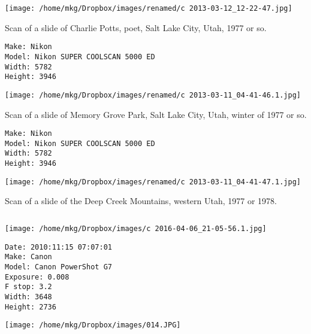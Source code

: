 \clearpage
\texttt{[image: /home/mkg/Dropbox/images/renamed/c 2013-03-12\_12-22-47.jpg]}

\clearpage

\noindent Scan of a slide of Charlie Potts, poet, Salt Lake City, Utah, 1977 or so.

\begin{lstlisting}
Make: Nikon
Model: Nikon SUPER COOLSCAN 5000 ED
Width: 5782
Height: 3946

\end{lstlisting}

\clearpage
\texttt{[image: /home/mkg/Dropbox/images/renamed/c 2013-03-11\_04-41-46.1.jpg]}

\clearpage

\noindent Scan of a slide of Memory Grove Park, Salt Lake City, Utah, winter of 1977 or so.

\begin{lstlisting}
Make: Nikon
Model: Nikon SUPER COOLSCAN 5000 ED
Width: 5782
Height: 3946

\end{lstlisting}

\clearpage
\texttt{[image: /home/mkg/Dropbox/images/renamed/c 2013-03-11\_04-41-47.1.jpg]}

\clearpage

\noindent Scan of a slide of the Deep Creek Mountains, western Utah, 1977 or 1978.

\begin{lstlisting}

\end{lstlisting}

\clearpage
\texttt{[image: /home/mkg/Dropbox/images/c 2016-04-06\_21-05-56.1.jpg]}

\clearpage

\noindent 

\begin{lstlisting}
Date: 2010:11:15 07:07:01
Make: Canon
Model: Canon PowerShot G7
Exposure: 0.008
F stop: 3.2
Width: 3648
Height: 2736

\end{lstlisting}

\clearpage
\texttt{[image: /home/mkg/Dropbox/images/014.JPG]}

\clearpage

